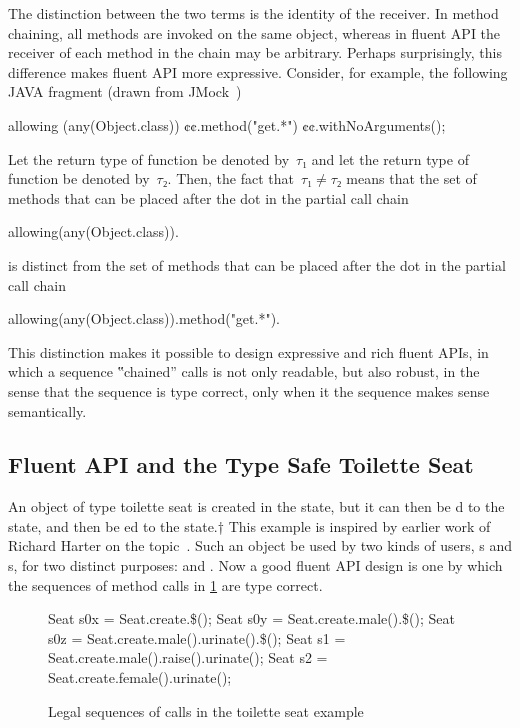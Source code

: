 The distinction between the two terms is the identity of the receiver.
In method chaining, all methods are invoked on the same object, whereas in fluent API
  the receiver of each method in the chain may be arbitrary.
Perhaps surprisingly, this difference makes fluent API more expressive.
Consider, for example, the following JAVA fragment (drawn from JMock~\cite{Freeman:Pryce:06})
\begin{JAVA}
allowing (any(Object.class))
  ¢¢.method("get.*")
  ¢¢.withNoArguments();
\end{JAVA}
Let the return type of function  be denoted by~$τ₁$ and let the
  return type of function  be denoted by~$τ₂$.
Then, the fact that~$τ₁≠τ₂$ means that the set of methods that can be placed after the dot
  in the partial call chain
\begin{JAVA}
allowing(any(Object.class)).
\end{JAVA}
is distinct from the set of methods that can be placed after the dot in the partial call chain
\begin{JAVA}
allowing(any(Object.class)).method("get.*").
\end{JAVA}
This distinction makes it possible to design expressive and rich fluent APIs, in which a
  sequence ‟chained” calls is not only readable, but also robust, in the sense that the
  sequence is type correct, only when it the sequence makes sense semantically.

\subsection{Fluent API and the Type Safe Toilette Seat}

An object of type toilette seat is created in the  state, but it can
then be d to the  state, and then be ed to the
 state.†{%
  This example is inspired by earlier work of
  Richard Harter on the topic~\cite{Harter:05}.
}
Such an object be used by two kinds of users, s and s, for two distinct purposes:
   and .
Now a good fluent API design is one by which the sequences of method calls in
  \cref{Figure:toilette:legal} are type correct.

\begin{figure}[htbp]
  \begin{JAVA}
Seat s0x = Seat.create.\$();
Seat s0y = Seat.create.male().\$();
Seat s0z = Seat.create.male().urinate().\$();
Seat s1 = Seat.create.male().raise().urinate();
Seat s2 = Seat.create.female().urinate();\end{JAVA}
  \caption{Legal sequences of calls in the toilette seat example}
  \label{Figure:toilette:legal}
\end{figure}

